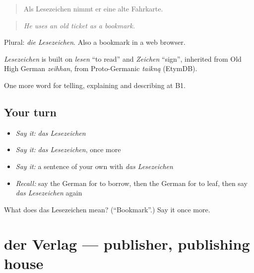 \begin{quote}
Als Lesezeichen nimmt er eine alte Fahrkarte.
\end{quote}

\begin{quote}
\emph{He uses an old ticket as a bookmark.}
\end{quote}

Plural: \emph{die Lesezeichen}. Also a bookmark in a web browser.

\begin{cousinweb}
\emph{Lesezeichen} is built on \emph{lesen} \textquotedblleft{}to read\textquotedblright{} and \emph{Zeichen} \textquotedblleft{}sign\textquotedblright{}, inherited from Old High German \emph{zeihhan}, from Proto-Germanic \emph{taikną} (EtymDB).
\end{cousinweb}

\begin{grammarlens}[title={What you've built}]
One more word for telling, explaining and describing at B1.
\end{grammarlens}

\subsection*{Your turn}
\begin{itemize}
\raggedright
  \item \emph{Say it:} \emph{das Lesezeichen}
  \item \emph{Say it:} \emph{das Lesezeichen}, once more
  \item \emph{Say it:} a sentence of your own with \emph{das Lesezeichen}
  \item \emph{Recall:} say the German for to borrow, then the German for to leaf, then say \emph{das Lesezeichen} again
\end{itemize}

\begin{tcolorbox}[breakable,colback=teal!4,colframe=teal!35!black,title={Before you move on}]
What does das Lesezeichen mean? (\textquotedblleft{}Bookmark\textquotedblright{}.) Say it once more.
\end{tcolorbox}
\section[der Verlag]{der Verlag — publisher, publishing house}

\label{lesson:GE-C522-verlag}




